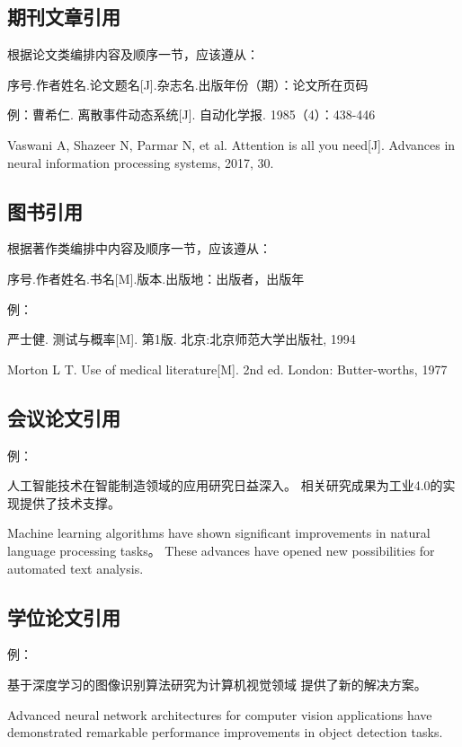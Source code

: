 \subsection{期刊文章引用}

根据论文类编排内容及顺序一节，应该遵从：

序号.作者姓名.论文题名[J].杂志名.出版年份（期）：论文所在页码

例：曹希仁. 离散事件动态系统[J]. 自动化学报. 1985（4）：438-446\cite{850419}

Vaswani A, Shazeer N, Parmar N, et al. Attention is all you need[J]. Advances in neural
information processing systems, 2017, 30.\cite{vaswani2017attention}

\subsection{图书引用}

根据著作类编排中内容及顺序一节，应该遵从：

序号.作者姓名.书名[M].版本.出版地：出版者，出版年

例：

严士健. 测试与概率[M]. 第1版. 北京:北京师范大学出版社, 1994\cite{严士健2003测度与概率}

Morton L T. Use of medical literature[M]. 2nd ed. London: Butter-worths, 1977\cite{morton1977use}

\subsection{会议论文引用}


例：

人工智能技术在智能制造领域的应用研究日益深入\cite{wang2021ai}。
相关研究成果为工业4.0的实现提供了技术支撑。

Machine learning algorithms have shown significant improvements in natural language processing tasks\cite{smith2021nlp}。
These advances have opened new possibilities for automated text analysis.

\subsection{学位论文引用}


例：

基于深度学习的图像识别算法研究\cite{liu2020thesis}为计算机视觉领域
提供了新的解决方案。

Advanced neural network architectures for computer vision applications\cite{johnson2020thesis} have demonstrated remarkable performance improvements in object detection tasks.

